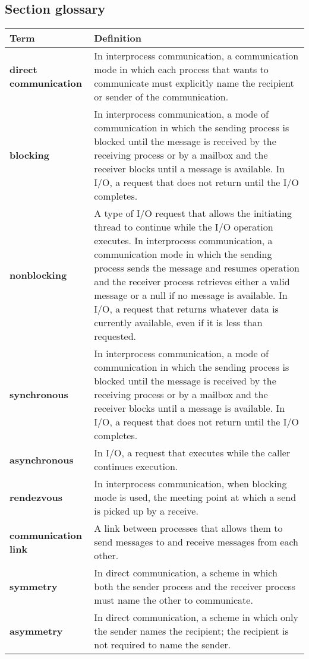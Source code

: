 \subsection*{Section glossary}
\centering
\begin{tabular}{>{\raggedright}p{} >{\raggedright\arraybackslash}p{}}
\toprule
\textbf{Term} & \textbf{Definition} \\
\midrule
\textbf{direct communication} & In interprocess communication, a communication mode in which each process that wants to communicate must explicitly name the recipient or sender of the communication. \\
\textbf{blocking} & In interprocess communication, a mode of communication in which the sending process is blocked until the message is received by the receiving process or by a mailbox and the receiver blocks until a message is available. In I/O, a request that does not return until the I/O completes. \\
\textbf{nonblocking} & A type of I/O request that allows the initiating thread to continue while the I/O operation executes. In interprocess communication, a communication mode in which the sending process sends the message and resumes operation and the receiver process retrieves either a valid message or a null if no message is available. In I/O, a request that returns whatever data is currently available, even if it is less than requested. \\
\textbf{synchronous} & In interprocess communication, a mode of communication in which the sending process is blocked until the message is received by the receiving process or by a mailbox and the receiver blocks until a message is available. In I/O, a request that does not return until the I/O completes. \\
\textbf{asynchronous} & In I/O, a request that executes while the caller continues execution. \\
\textbf{rendezvous} & In interprocess communication, when blocking mode is used, the meeting point at which a send is picked up by a receive. \\
\textbf{communication link} & A link between processes that allows them to send messages to and receive messages from each other. \\
\textbf{symmetry} & In direct communication, a scheme in which both the sender process and the receiver process must name the other to communicate. \\
\textbf{asymmetry} & In direct communication, a scheme in which only the sender names the recipient; the recipient is not required to name the sender. \\

\end{tabular}
